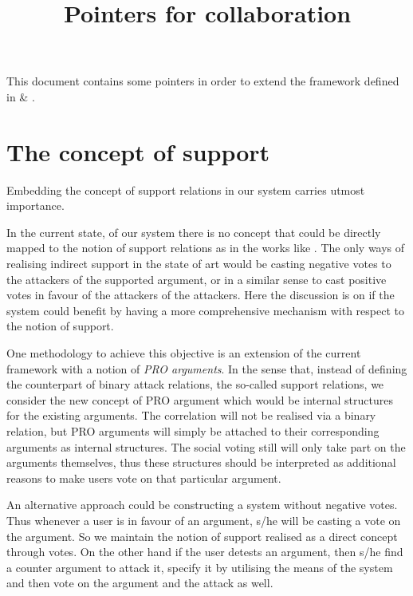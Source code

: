 \documentclass{article}
\begin{document}
\title{Pointers for collaboration}

\maketitle

This document contains some pointers in order to extend the framework defined in \cite{leite2011social} \& \cite{eml2013esaf}.

\section{The concept of support} %

Embedding the concept of support relations in our system carries utmost importance.

In the current state, of our system there is no concept that could be directly mapped to the notion of support relations as in the works like \cite{DBLP:journals/ijis/AmgoudCLL08}. The only ways of realising indirect support in the state of art would be casting negative votes to the attackers of the supported argument, or in a similar sense to cast positive votes in favour of the attackers of the attackers. Here the discussion is on if the system could benefit by having a more comprehensive mechanism with respect to the notion of support. 

One methodology to achieve this objective is an extension of the current framework with a notion of \emph{PRO arguments}. In the sense that, instead of defining the counterpart of binary attack relations, the so-called support relations, we consider the new concept of PRO argument which would be internal structures for the existing arguments. The correlation will not be realised via a binary relation, but PRO arguments will simply be attached to their corresponding arguments as internal structures. The social voting still will only take part on the arguments themselves, thus these structures should be interpreted as additional reasons to make users vote on that particular argument.

An alternative approach could be constructing a system without negative votes. Thus whenever a user is in favour of an argument, s/he will be casting a vote on the argument. So we maintain the notion of support realised as  a direct concept through votes. On the other hand if the user detests an argument, then s/he find a counter argument to attack it, specify it by utilising the means of the system and then vote on the argument and the attack as well.
\end{document}
